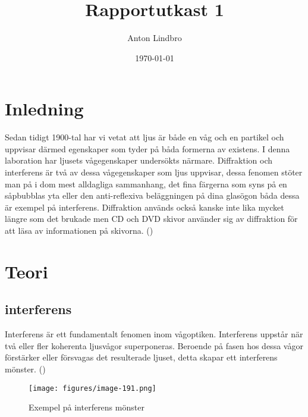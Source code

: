 \documentclass[a4paper]{article}
\title{Rapportutkast 1}
\author{Anton Lindbro}
\date{\today}
\begin{document}
\maketitle

\begin{abstract}
    
\end{abstract}

\pagebreak

\tableofcontents

\pagebreak

\section{Inledning}

Sedan tidigt 1900-tal har vi vetat att ljus är både en våg och en partikel och uppvisar därmed egenskaper som tyder på båda formerna av existens. I denna laboration har ljusets vågegenskaper undersökts närmare. Diffraktion och interferens är två av dessa vågegenskaper som ljus uppvisar, dessa fenomen stöter man på i dom mest alldagliga sammanhang, det fina färgerna som syns på en såpbubblas yta eller den anti-reflexiva beläggningen på dina glasögon båda dessa är exempel på interferens. Diffraktion används också kanske inte lika mycket längre som det brukade men CD och DVD skivor använder sig av diffraktion för att läsa av informationen på skivorna. (\cite{MIT_diff_and_interference})

\section{Teori}

\subsection{interferens}
Interferens är ett fundamentalt fenomen inom vågoptiken. Interferens uppstår när två eller fler koherenta ljusvågor superponeras. Beroende på fasen hos dessa vågor förstärker eller försvagas det resulterade ljuset, detta skapar ett interferens mönster.
(\cite{Hecht2017})

\begin{figure}[H]
    \begin{small}
        \begin{center}
            \texttt{[image: figures/image-191.png]}
        \end{center}
        \caption{Exempel på interferens mönster}
        \label{fig:interferens}
    \end{small}
\end{figure}
\cite{DoubleSlitInterferenceImage}
\end{document}

